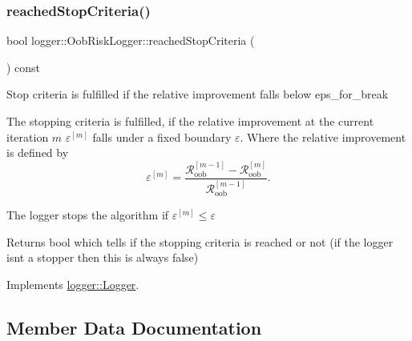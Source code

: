 \mbox{\label{classlogger_1_1_oob_risk_logger_a5c1c8358ffcb5f5463b43f068ea21aa4}} 
\subsubsection{\texorpdfstring{reached\+Stop\+Criteria()}{reachedStopCriteria()}}
{\footnotesize\ttfamily bool logger\+::\+Oob\+Risk\+Logger\+::reached\+Stop\+Criteria (\begin{DoxyParamCaption}{ }\end{DoxyParamCaption}) const\hspace{0.3cm}{\ttfamily [virtual]}}



Stop criteria is fulfilled if the relative improvement falls below {\ttfamily eps\+\_\+for\+\_\+break} 

The stopping criteria is fulfilled, if the relative improvement at the current iteration $m$ $\varepsilon^{[m]}$ falls under a fixed boundary $\varepsilon$. Where the relative improvement is defined by \[ \varepsilon^{[m]} = \frac{\mathcal{R}_\mathrm{oob}^{[m-1]} - \mathcal{R}_\mathrm{oob}^{[m]}}{\mathcal{R}_\mathrm{oob}^{[m-1]}}. \]

The logger stops the algorithm if $\varepsilon^{[m]} \leq \varepsilon$

\begin{DoxyReturn}{Returns}
{\ttfamily bool} which tells if the stopping criteria is reached or not (if the logger isn\textquotesingle{}t a stopper then this is always false) 
\end{DoxyReturn}


Implements \mbox{\hyperlink{classlogger_1_1_logger_aed91421c07062b91cee158ef2bda7ae8}{logger\+::\+Logger}}.



\subsection{Member Data Documentation}
\mbox{\label{classlogger_1_1_oob_risk_logger_a6dccaf686895c4a3f9eb88a8f74e65fa}} 
